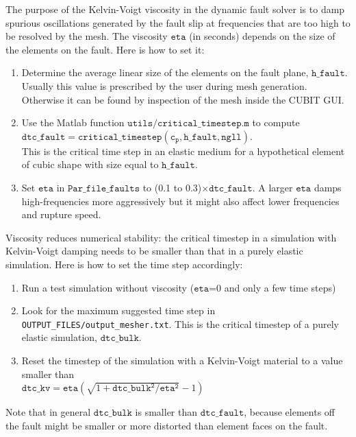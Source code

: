 The purpose of the Kelvin-Voigt viscosity in the dynamic fault solver
is to damp spurious oscillations generated by the fault slip at frequencies
that are too high to be resolved by the mesh. The viscosity $\mathtt{eta}$
(in seconds) depends on the size of the elements on the fault. Here
is how to set it:
\begin{enumerate}
\item Determine the average linear size of the elements on the fault plane,
$\mathtt{h\_fault}$. Usually this value is prescribed by the user
during mesh generation. Otherwise it can be found by inspection of
the mesh inside the CUBIT GUI.
\item Use the Matlab function $\mathtt{utils/critical\_timestep.m}$ to
compute\\
 $\mathtt{dtc\_fault}=\mathtt{critical\_timestep\left(c_{p},h\_fault,ngll\right)}$.
\\
This is the critical time step in an elastic medium for a hypothetical
element of cubic shape with size equal to $\mathtt{h\_fault}$.
\item Set $\mathtt{eta}$ in $\mathtt{Par\_file\_faults}$ to (0.1 to 0.3)$\ensuremath{\times}\mathtt{dtc\_fault}$.
A larger $\mathtt{eta}$ damps high-frequencies more aggressively
but it might also affect lower frequencies and rupture speed.
\end{enumerate}
Viscosity reduces numerical stability: the critical timestep in a
simulation with Kelvin-Voigt damping needs to be smaller than that
in a purely elastic simulation. Here is how to set the time step accordingly:
\begin{enumerate}
\item Run a test simulation without viscosity ($\mathtt{eta}$=0 and only
a few time steps)
\item Look for the \textquotedbl{}maximum suggested time step\textquotedbl{}
in \texttt{OUTPUT\_FILES/output\_mesher.txt}. This is the critical
timestep of a purely elastic simulation, $\mathtt{dtc\_bulk}$.
\item Reset the timestep of the simulation with a Kelvin-Voigt material
to a value smaller than\\
 $\mathtt{dtc\_kv}=\mathtt{eta}\left(\sqrt{1+\mathtt{dtc\_bulk^{2}}/\mathtt{eta^{2}}}-1\right)$
\end{enumerate}
Note that in general $\mathtt{dtc\_bulk}$ is smaller than $\mathtt{dtc\_fault}$,
because elements off the fault might be smaller or more distorted
than element faces on the fault.


